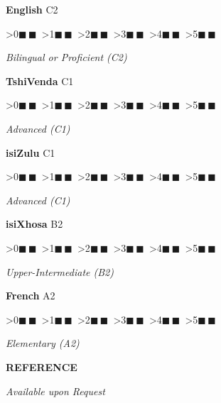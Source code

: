 \documentclass[11pt, a4paper]{article}
\newcommand{\cvsection}[1]{%
  \vspace{6pt}%
  \noindent%
  \colorbox{DKGreen}{\hspace{4pt}\rule{0pt}{14pt}\hspace{4pt}}%
  \colorbox{CardBG}{%
    \parbox[c][14pt]{\dimexpr\linewidth-16pt\relax}{%
      \hspace{8pt}\textcolor{DKGreen}{\textbf{\large\MakeUppercase{#1}}}%
    }%
  }%
  \par
  \noindent{\color{BorderClr}\rule{\linewidth}{0.6pt}}%
  \vspace{4pt}\par\noindent%
}
\newcommand{\sqon}{\textcolor{DKGreen}{$\blacksquare$}\,}
\newcommand{\sqoff}{\textcolor{BorderClr}{$\blacksquare$}\,}
\newcommand{\langbar}[1]{%
  \ifnum#1>0\sqon\else\sqoff\fi%
  \ifnum#1>1\sqon\else\sqoff\fi%
  \ifnum#1>2\sqon\else\sqoff\fi%
  \ifnum#1>3\sqon\else\sqoff\fi%
  \ifnum#1>4\sqon\else\sqoff\fi%
  \ifnum#1>5\sqon\else\sqoff\fi%
}
\begin{document}
\vspace{4pt}
\noindent
\begin{minipage}[t]{0.30\linewidth}
\noindent\textcolor{DKGreen}{\textbf{English}}%
\hfill\textcolor{LiteTxt}{\small C2}\par
\vspace{2pt}%
\langbar{6}\par
\vspace{1pt}%
\textcolor{LiteTxt}{\textit{\small Bilingual or Proficient (C2)}}
\end{minipage}%
\hfill
\begin{minipage}[t]{0.30\linewidth}
\noindent\textcolor{DKGreen}{\textbf{TshiVenda}}%
\hfill\textcolor{LiteTxt}{\small C1}\par
\vspace{2pt}%
\langbar{5}\par
\vspace{1pt}%
\textcolor{LiteTxt}{\textit{\small Advanced (C1)}}
\end{minipage}%
\hfill
\begin{minipage}[t]{0.30\linewidth}
\noindent\textcolor{DKGreen}{\textbf{isiZulu}}%
\hfill\textcolor{LiteTxt}{\small C1}\par
\vspace{2pt}%
\langbar{5}\par
\vspace{1pt}%
\textcolor{LiteTxt}{\textit{\small Advanced (C1)}}
\end{minipage}%
\par\vspace{6pt}\noindent
\begin{minipage}[t]{0.30\linewidth}
\noindent\textcolor{DKGreen}{\textbf{isiXhosa}}%
\hfill\textcolor{LiteTxt}{\small B2}\par
\vspace{2pt}%
\langbar{4}\par
\vspace{1pt}%
\textcolor{LiteTxt}{\textit{\small Upper-Intermediate (B2)}}
\end{minipage}%
\hfill
\begin{minipage}[t]{0.30\linewidth}
\noindent\textcolor{DKGreen}{\textbf{French}}%
\hfill\textcolor{LiteTxt}{\small A2}\par
\vspace{2pt}%
\langbar{2}\par
\vspace{1pt}%
\textcolor{LiteTxt}{\textit{\small Elementary (A2)}}
\end{minipage}%
\hfill

\cvsection{Reference}

\vspace{4pt}
\noindent\textcolor{LiteTxt}{\textit{Available upon Request}}
\end{document}
